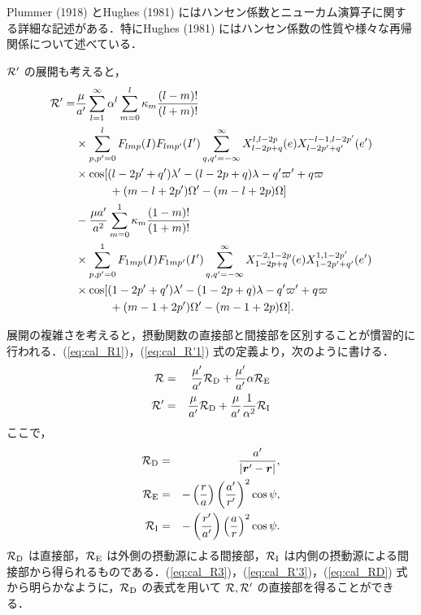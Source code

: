 \documentclass[11pt,a4paper,oneside,onecolumn]{jreport}
\begin{document}
Plummer (1918) とHughes (1981) にはハンセン係数とニューカム演算子に関する詳細な記述がある．特にHughes (1981) にはハンセン係数の性質や様々な再帰関係について述べている．

${\cal R'}$ の展開も考えると，
\begin{equation}
\begin{split}
{\cal R'} = & \frac{\mu}{a'} \sum_{l = 1}^{\infty} \alpha^l \sum_{m = 0}^l \kappa_m \frac{(l - m) !}{(l + m) !} \\
& \times \sum_{p,p' = 0}^l F_{lmp} (I) F_{lmp'} (I') \sum_{q,q' = - \infty}^{\infty} X_{l - 2p + q}^{l, l - 2p} (e) X_{l - 2p' + q'}^{-l -1, l - 2p'} (e') \\
& \times \cos [ (l - 2p' + q') \lambda' - (l - 2p + q) \lambda - q' \varpi' + q \varpi \\
& \quad \quad \quad + (m - l + 2p') \Omega' - (m - l + 2p) \Omega ] \\
& - \frac{\mu a'}{a^2} \sum_{m = 0}^1 \kappa_m \frac{(1 - m) !}{(1 + m) !} \\
& \times \sum_{p,p' = 0}^1 F_{1mp} (I) F_{1mp'} (I') \sum_{q,q' = - \infty}^{\infty} X_{1 - 2p + q}^{-2, 1 - 2p} (e) X_{1 - 2p' + q'}^{1, 1 - 2p'} (e') \\
& \times \cos [ (1 - 2p' +q') \lambda' - (1 -2p + q) \lambda - q' \varpi' +q \varpi \\
& \quad \quad \quad + (m - 1 + 2p') \Omega' - (m - 1 + 2p) \Omega ].
\end{split}
\end{equation}

展開の複雑さを考えると，摂動関数の直接部と間接部を区別することが慣習的に行われる．(\ref{eq:cal_R1})，(\ref{eq:cal_R'1}) 式の定義より，次のように書ける．
\begin{eqnarray}
{\cal R} & = & \frac{\mu'}{a'} {\cal R}_{\rm D} + \frac{\mu'}{a'} \alpha {\cal R}_{\rm E} \label{eq:cal_R3} \\
{\cal R'} & = & \frac{\mu}{a'} {\cal R}_{\rm D} + \frac{\mu}{a'} \frac{1}{\alpha^2} {\cal R}_{\rm I} \label{eq:cal_R'3}
\end{eqnarray}
ここで，
\begin{eqnarray}
{\cal R}_{\rm D} & = & \frac{a'}{|{\bm r'} - {\bm r}|}, \label{eq:cal_RD}\\
{\cal R}_{\rm E} & = & - \left( \frac{r}{a} \right) \left( \frac{a'}{r'} \right)^2 \cos \psi, \label{eq:cal_RE} \\
{\cal R}_{\rm I} & = & - \left( \frac{r'}{a'} \right) \left( \frac{a}{r} \right)^2 \cos \psi. \label{eq:cal_RI}
\end{eqnarray}
${\cal R}_{\rm D}$ は直接部，${\cal R}_{\rm E}$ は外側の摂動源による間接部，${\cal R}_{\rm I}$ は内側の摂動源による間接部から得られるものである．(\ref{eq:cal_R3})，(\ref{eq:cal_R'3})，(\ref{eq:cal_RD}) 式から明らかなように，${\cal R}_{\rm D}$ の表式を用いて ${\cal R}, {\cal R'}$ の直接部を得ることができる．
\end{document}
